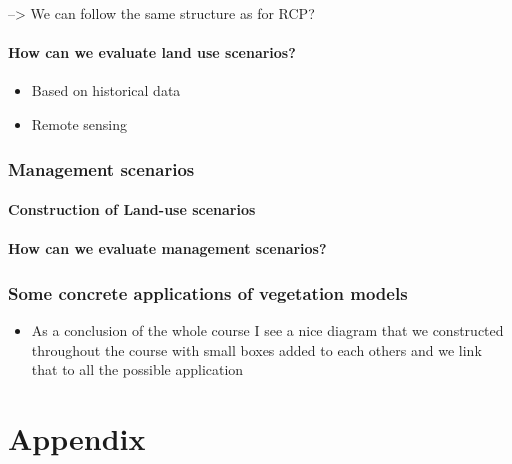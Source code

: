 \documentclass[
  12pt,
  oneside]{book}
\providecommand{\tightlist}{%
  \setlength{\itemsep}{0pt}\setlength{\parskip}{0pt}}
\begin{document}
--\textgreater{} We can follow the same structure as for RCP?

\hypertarget{how-can-we-evaluate-land-use-scenarios}{%
\subsection{How can we evaluate land use scenarios?}\label{how-can-we-evaluate-land-use-scenarios}}

\begin{itemize}
\tightlist
\item
  Based on historical data
\item
  Remote sensing
\end{itemize}

\hypertarget{management-scenarios}{%
\section{Management scenarios}\label{management-scenarios}}

\hypertarget{construction-of-land-use-scenarios-1}{%
\subsection{Construction of Land-use scenarios}\label{construction-of-land-use-scenarios-1}}

\hypertarget{how-can-we-evaluate-management-scenarios}{%
\subsection{How can we evaluate management scenarios?}\label{how-can-we-evaluate-management-scenarios}}

\hypertarget{some-concrete-applications-of-vegetation-models}{%
\section{Some concrete applications of vegetation models}\label{some-concrete-applications-of-vegetation-models}}

\begin{itemize}
\tightlist
\item
  As a conclusion of the whole course I see a nice diagram that we constructed throughout the course with small boxes added to each others and we link that to all the possible application
\end{itemize}

\hypertarget{part-appendix}{%
\part{Appendix}\label{part-appendix}}
\end{document}
